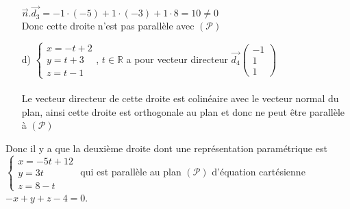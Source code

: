 \documentclass[a4paper, 12pt]{article}
\begin{document}
\begin{itemize}
        $\vec{n}.\vec{d_3} = -1 \cdot (-5) + 1 \cdot (-3) + 1 \cdot 8 = 10 \neq 0$ \\ 
        Donc cette droite n'est pas parallèle avec $(\mathcal{P})$
    \item[d)] $\begin{cases} x = -t + 2 \\ y = t + 3 \\ z = t - 1 \end{cases}$, $t \in \mathds{R}$ a pour vecteur directeur $\vec{d_4}\begin{pmatrix} -1 \\ 1 \\ 1 \end{pmatrix}$ \\ \\ 
    Le vecteur directeur de cette droite est colinéaire avec le vecteur normal du plan, ainsi cette droite est orthogonale au plan et donc ne peut être parallèle à $(\mathcal{P})$\\ 
\end{itemize}
Donc il y a que la deuxième droite dont une représentation paramétrique est $\begin{cases} x = -5t + 12 \\ y = 3t \\ z = 8-t \end{cases}$ 
qui est parallèle au plan $(\mathcal{P})$ d'équation cartésienne $ - x + y + z - 4 = 0$.

{}
\end{document}
